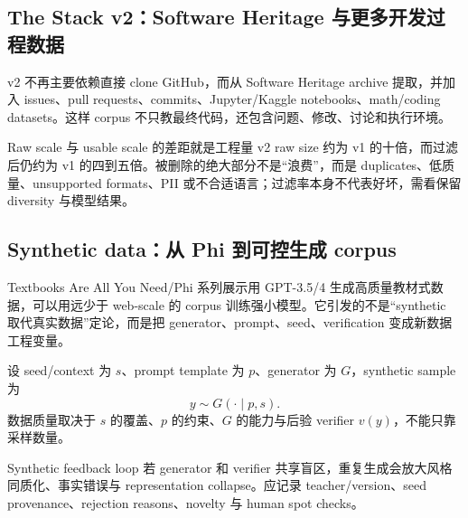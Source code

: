 
\subsection{The Stack v2：Software Heritage 与更多开发过程数据}

v2 不再主要依赖直接 clone GitHub，而从 Software Heritage archive 提取，并加入 issues、pull requests、commits、Jupyter/Kaggle notebooks、math/coding datasets。这样 corpus 不只教最终代码，还包含问题、修改、讨论和执行环境。



\begin{importantbox}{Raw scale 与 usable scale 的差距就是工程量}
v2 raw size 约为 v1 的十倍，而过滤后仍约为 v1 的四到五倍。被删除的绝大部分不是“浪费”，而是 duplicates、低质量、unsupported formats、PII 或不合适语言；过滤率本身不代表好坏，需看保留 diversity 与模型结果。
\end{importantbox}


\subsection{Synthetic data：从 Phi 到可控生成 corpus}

Textbooks Are All You Need/Phi 系列展示用 GPT-3.5/4 生成高质量教材式数据，可以用远少于 web-scale 的 corpus 训练强小模型。它引发的不是“synthetic 取代真实数据”定论，而是把 generator、prompt、seed、verification 变成新数据工程变量。


设 seed/context 为 $s$、prompt template 为 $p$、generator 为 $G$，synthetic sample 为
\[
y\sim G(\cdot\mid p,s).
\]
数据质量取决于 $s$ 的覆盖、$p$ 的约束、$G$ 的能力与后验 verifier $v(y)$，不能只靠采样数量。

\begin{warningbox}{Synthetic feedback loop}
若 generator 和 verifier 共享盲区，重复生成会放大风格同质化、事实错误与 representation collapse。应记录 teacher/version、seed provenance、rejection reasons、novelty 与 human spot checks。
\end{warningbox}

